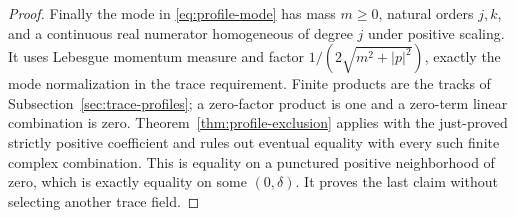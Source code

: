 \begin{proof}
Finally the mode in \eqref{eq:profile-mode} has mass $m\ge0$, natural
orders $j,k$, and a continuous real numerator homogeneous of degree
$j$ under positive scaling. It uses Lebesgue momentum measure and
factor $1/(2\sqrt{m^2+|p|^2})$, exactly the mode normalization in the
trace requirement. Finite products are the tracks of
Subsection~\ref{sec:trace-profiles}; a zero-factor product is one and a
zero-term linear combination is zero. Theorem~\ref{thm:profile-exclusion}
applies with the just-proved strictly positive coefficient and rules
out eventual equality with every such finite complex combination.
This is equality on a punctured positive neighborhood of zero, which
is exactly equality on some $(0,\delta)$. It proves the last claim
without selecting another trace field.
\end{proof}

